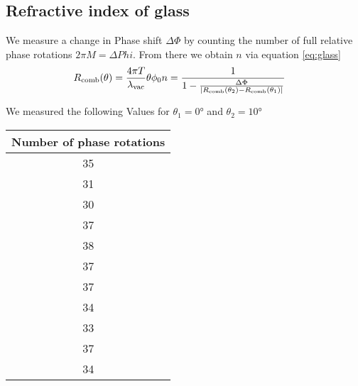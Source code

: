 \subsection{Refractive index of glass}
We measure a change in Phase shift $\Delta \Phi$ by counting the number of full
relative phase rotations $2 \pi M = \Delta Phi$. From there we obtain $n$ via
equation \eqref{eq:glass}
\begin{align}
	R_\text{comb}(\theta) = \frac{4\pi T}{\lambda_\text{vac}}\theta\phi_0
	n & = \frac{1}{1-\frac{\Delta \Phi}{\left|R_\text{comb}(\theta_{2})-R_\text{comb}(\theta_{1})\right|} } \label{eq:nAtmos}
\end{align}

We measured the following Values for $\theta_1 = 0°$ and $\theta_2 = 10°$
\begin{table}[H]
	\centering
	\begin{tabular}{c}
		\toprule
		Number of phase rotations \\
		\midrule
		35                        \\
		31                        \\
		30                        \\
		37                        \\
		38                        \\
		37                        \\
		37                        \\
		34                        \\
		33                        \\
		37                        \\
		34                        \\
		\bottomrule
	\end{tabular}
\end{table}

